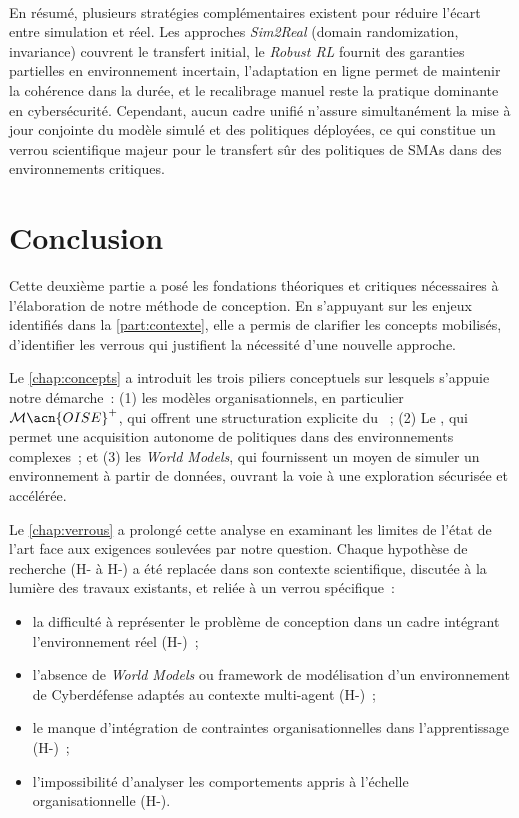 \

\noindent
En résumé, plusieurs stratégies complémentaires existent
pour réduire l’écart entre simulation et réel.
Les approches \textit{Sim2Real} (domain randomization, invariance)
couvrent le transfert initial,
le \textit{Robust RL} fournit des garanties partielles en environnement incertain,
l’adaptation en ligne permet de maintenir la cohérence dans la durée,
et le recalibrage manuel reste la pratique dominante en cybersécurité.
Cependant, aucun cadre unifié n’assure simultanément
la mise à jour conjointe du modèle simulé et des politiques déployées,
ce qui constitue un verrou scientifique majeur pour le transfert sûr
des politiques de \acp{SMA} dans des environnements critiques.



\chapter*{Conclusion}

\noindent
Cette deuxième partie a posé les fondations théoriques et critiques nécessaires à l'élaboration de notre méthode de conception. En s'appuyant sur les enjeux identifiés dans la \autoref{part:contexte}, elle a permis de clarifier les concepts mobilisés, d'identifier les verrous qui justifient la nécessité d'une nouvelle approche.

\medskip

\noindent
Le \autoref{chap:concepts} a introduit les trois piliers conceptuels sur lesquels s'appuie notre démarche~: (1) les modèles organisationnels, en particulier \textit{$\mathcal{M}\acn{OISE}^+$}, qui offrent une structuration explicite du ~; (2) Le , qui permet une acquisition autonome de politiques dans des environnements complexes~; et (3) les \textit{World Models}, qui fournissent un moyen de simuler un environnement à partir de données, ouvrant la voie à une exploration sécurisée et accélérée.

\noindent
Le \autoref{chap:verrous} a prolongé cette analyse en examinant les limites de l'état de l'art face aux exigences soulevées par notre question. Chaque hypothèse de recherche (H- à H-) a été replacée dans son contexte scientifique, discutée à la lumière des travaux existants, et reliée à un verrou spécifique~:
\begin{itemize}
  \item la difficulté à représenter le problème de conception dans un cadre intégrant l'environnement réel (H-)~;
  \item l'absence de \textit{World Models} ou framework de modélisation d'un environnement de Cyberdéfense adaptés au contexte multi-agent (H-)~;
  \item le manque d'intégration de contraintes organisationnelles dans l'apprentissage (H-)~;
  \item l'impossibilité d'analyser les comportements appris à l'échelle organisationnelle (H-).
\end{itemize}

